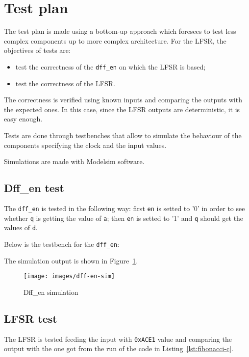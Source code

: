 \documentclass[11pt,a4paper,oneside, openright]{article}
\begin{document}
\section{Test plan}
The test plan is made using a bottom-up approach which foresees to test less complex components up to more complex architecture. For the LFSR, the objectives of tests are:
\begin{itemize}
    \item test the correctness of the \texttt{dff\_en} on which the LFSR is based;
    \item test the correctness of the LFSR.
\end{itemize}

The correctness is verified using known inputs and comparing the outputs with the expected ones. In this case, since the LFSR outputs are deterministic, it is easy enough.
 
Tests are done through testbenches that allow to simulate the behaviour of the components specifying the clock and the input values.

Simulations are made with Modelsim software.

\subsection{Dff\_en test}
The \texttt{dff\_en} is tested in the following way: first \texttt{en} is setted to '0' in order to see whether \texttt{q} is getting the value of \texttt{a}; then \texttt{en} is setted to '1' and \texttt{q} should get the values of \texttt{d}.

Below is the testbench for the \texttt{dff\_en}:



The simulation output is shown in Figure~\ref{fig:dff-en-sim}.

\begin{figure}[h]
    \centering
    \texttt{[image: images/dff-en-sim]}
    \caption{Dff\_en simulation}
    \label{fig:dff-en-sim}
\end{figure}

\subsection{LFSR test}
The LFSR is tested feeding the input with \texttt{0xACE1} value and comparing the output with the one got from the run of the code in Listing~\ref{lst:fibonacci-c}.
\end{document}

